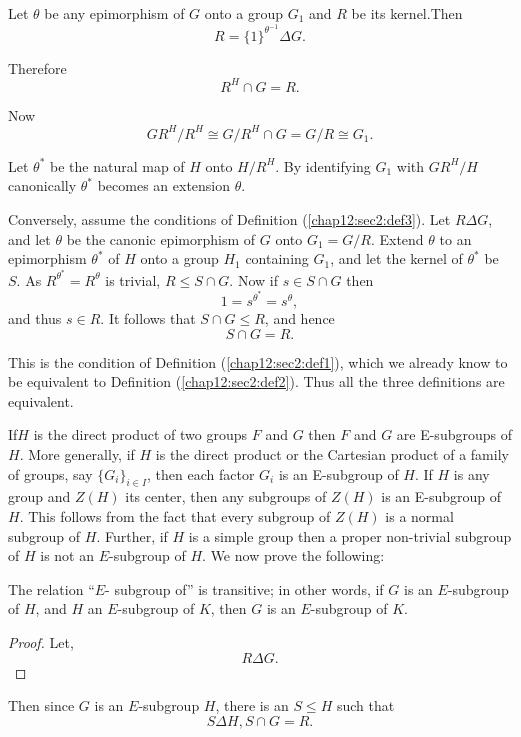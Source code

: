  Let $\theta$ be any epimorphism of $G$ onto a group $G_1$ and $R$ be
 its kernel.\pageoriginale Then  
 $$
 R= \{ 1\}^{\theta^{-1}} \Delta G.
 $$
 
 Therefore
 $$
 R^H \cap G = R.
 $$
 
 Now
 $$
 GR^H / R^H \cong G/R^H \cap G= G/R \cong G_1. 
 $$ 
 
Let $\theta^*$ be the natural map of $H$ onto $H/R^H$. By identifying
$G_1$ with $GR^H/H$ canonically $\theta^*$ becomes an extension
$\theta$. 
 
Conversely, assume the conditions of Definition (\ref{chap12:sec2:def3}). Let $R \Delta
G$, and let $\theta$ be the canonic epimorphism of $G$ onto $G_1 =
G/R$. Extend $\theta$ to an epimorphism $\theta^*$ of  $H$ onto a
group $H_1$ containing $G_1$, and let the kernel of $\theta^*$ be
$S$. As $R^{\theta^*}= R^{\theta}$ is trivial, $R \le S \cap G$. Now
if $s \in  S \cap G$ then 
$$
1=s^{\theta^*}= s^{\theta}, 
$$ 
and thus $s \in  R$. It follows that $S \cap G \le R$, and hence 
$$
S \cap G =R. 
$$
 
This is the condition of Definition (\ref{chap12:sec2:def1}), which we already know to be
equivalent to Definition (\ref{chap12:sec2:def2}). Thus all the three definitions are
equivalent. 
 
If\pageoriginale $H$ is the direct product of two groups $F$ and $G$ then $F$ and
$G$ are E-subgroups of $H$. More generally, if $H$ is the direct
product or the Cartesian product of a family of groups, say
$\{G_i\}_{i \in   I}$, then each factor $G_i$ is an E-subgroup
of $H$. If $H$ is any group and $Z(H)$ its center, then any subgroups
of $Z(H)$ is an E-subgroup of $H$. This follows from the fact that
every subgroup of $Z(H)$ is a normal subgroup of $H$. Further,  if $H$ is a simple group then a proper non-trivial
subgroup of $H$ is not an $E$-subgroup of $H$. We now prove the
following: 
\begin{theorem}\label{chap12:sec2:thm2} %
  The relation ``$E$- subgroup of'' is transitive; in other words, if
  $G$ is an $E$-subgroup of $H$, and $H$ an $E$-subgroup of $K$, then
  $G$ is an $E$-subgroup of $K$. 
\end{theorem} 

\begin{proof}
  Let,
  $$
  R \Delta G.
  $$
\end{proof}

 Then since $G$ is an $E$-subgroup $H$, there is an $S \le  H$ such that 
 $$
 S \Delta H, S \cap G =R.
 $$
 
